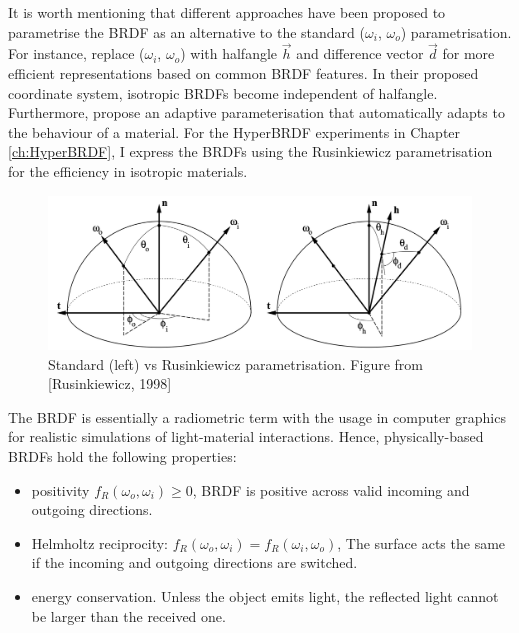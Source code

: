 It is worth mentioning that different approaches have been proposed to parametrise the \gls{BRDF} as an alternative to the standard ($\omega_i$, $\omega_o$) parametrisation.  For instance, \citeauthor{rusinkiewicz1998new} \cite{rusinkiewicz1998new} replace ($\omega_i$, $\omega_o$)  with halfangle $\vec{h}$ and difference vector $\vec{d}$ for more efficient representations based on common \gls{BRDF} features. In their proposed coordinate system, isotropic \gls{BRDF}s become independent of halfangle. Furthermore, \citeauthor{dupuy2018adaptive} \cite{dupuy2018adaptive} propose an adaptive parameterisation that automatically adapts to the behaviour of a material. For the HyperBRDF experiments in Chapter \ref{ch:HyperBRDF}, I express the BRDFs using the Rusinkiewicz parametrisation \cite{rusinkiewicz1998new} for the efficiency in isotropic materials.


\begin{figure}[ht]
  \centering
   \includegraphics[width=\linewidth]{Images/Rusinkiewicz.png}
   \caption{Standard (left) vs Rusinkiewicz parametrisation. Figure from [Rusinkiewicz, 1998]}
   \label{fig:RusinkiewiczvsStandard}
\end{figure}


The \gls{BRDF} is essentially a radiometric term with the usage in computer graphics for realistic simulations of light-material interactions. Hence, physically-based \gls{BRDF}s hold the following properties:
\begin{itemize}
  \item positivity $f_R(\omega_o, \omega_i) \geq 0$, \gls{BRDF} is positive across valid incoming and outgoing directions.
  \item Helmholtz reciprocity: $f_R(\omega_o, \omega_i) = f_R(\omega_i, \omega_o)$, The surface acts the same if the incoming and outgoing directions are switched.
  \item energy conservation. Unless the object emits light, the reflected light cannot be larger than the received one.
\end{itemize}


